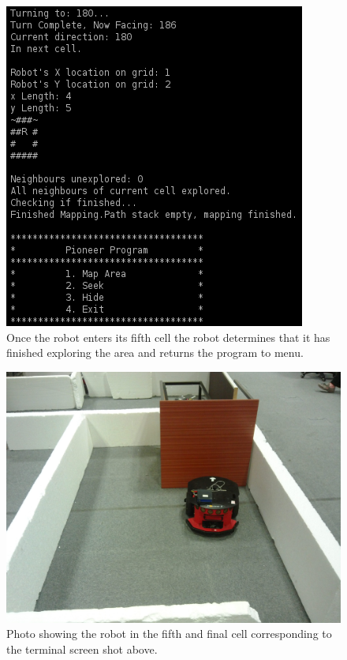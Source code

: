 \documentclass[a4paper,12pt]{article}
\begin{document}
\begin{figure}[H]
\includegraphics[scale=1.0]{RealRunT5.png}
\caption{Once the robot enters its fifth cell the robot determines that it has finished exploring the area and returns the program to menu.}
\end{figure}

\begin{figure}[H]
\includegraphics[scale=0.13]{RealS5.jpg}
\caption{Photo showing the robot in the fifth and final cell corresponding to the terminal screen shot above.}
\end{figure}
\end{document}
